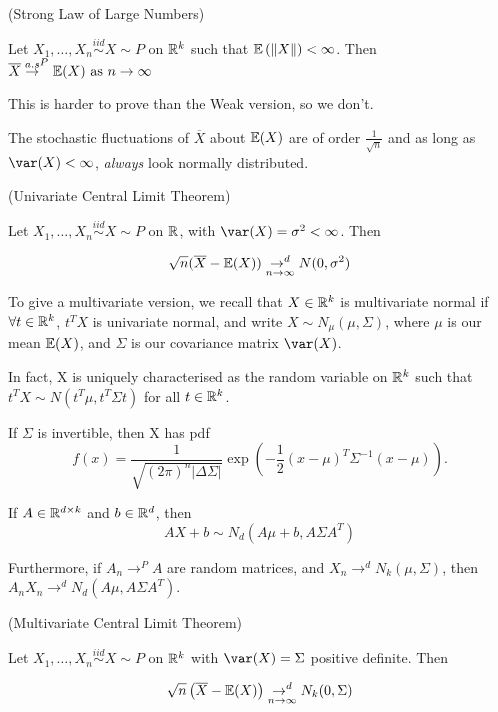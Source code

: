 \documentclass[a4paper]{article}
\begin{document}
\begin{thm}
	(Strong Law of Large Numbers)

	Let $X_1, \ldots, X_n \stackrel{iid}{\sim} X \sim P$ on $\mathbb{R}^{k}$ such that $\mathbb{E}\left(\|X\|  \right)  < \infty$. Then $\overline{X} \overset{a.s}{\to}^{P} \mathbb{E}(X) \text{ as } n \to \infty$
\end{thm}

This is harder to prove than the Weak version, so we don't.

The stochastic fluctuations of $\overline{X}$ about $\mathbb{E}(X)$ are of order $\frac{1}{\sqrt{n} }$ and as long as $\var(X) < \infty$, \textit{always} look normally distributed.

\begin{thm}
	(Univariate Central Limit Theorem)

	Let $X_1, \ldots, X_n \stackrel{iid}{\sim} X \sim P$ on $\mathbb{R}$, with $\var(X) = \sigma^2 < \infty$. Then

	\[
		\sqrt{n} (\overline{X} - \mathbb{E}(X)) \underset{n \to  \infty}{\to^{d}} N(0, \sigma^2)
	\] 
\end{thm}

To give a multivariate version, we recall that $X \in \mathbb{R}^{k}$ is multivariate normal if $\forall t \in \mathbb{R}^{k}$, $t^{T}X$ is univariate normal, and write $X\sim N_{\mu}(\mu, \Sigma)$, where $\mu$ is our mean  $\mathbb{E}(X)$, and  $\Sigma $ is our covariance matrix $\var(X)$.

In fact, X is uniquely characterised as the random variable on  $\mathbb{R}^{k}$ such that $t ^{T}X \sim N(t ^{T}\mu, t ^{T}\Sigma t)$ for all $t \in \mathbb{R}^{k}$.

If $\Sigma$ is invertible, then X has pdf
\[
	f(x) = \frac{1}{\sqrt{(2\pi)^{n}|\Delta \Sigma|} } \exp\left( - \frac{1}{2} (x-\mu)^{T} \Sigma^{-1} (x - \mu) \right) 
.\] 

If $A \in \mathbb{R}^{d\times k}$ and $b \in \mathbb{R}^{d}$, then
\[
	AX + b \sim N_{d}\left( A\mu + b, A\Sigma A^{T} \right) 
\] 

Furthermore, if $A_{n} \to^{P} A$ are random matrices, and $X_n \to ^{d} N_{k}\left( \mu, \Sigma \right) $, then $A_n X_n \to ^{d} N_{d}\left( A\mu, A\Sigma A^{T} \right) $.

\begin{thm}
	(Multivariate Central Limit Theorem)

	Let $X_1, \ldots, X_n \stackrel{iid}{\sim} X \sim P$ on $\mathbb{R}^{k}$ with $\var(X) = \Sigma$ positive definite. Then

	 \[
		 \sqrt{n} \left( \overline{X} - \mathbb{E}(X) \right) \underset{n \to \infty}{\to ^{d}} N_{k}(0, \Sigma)
	\] 
\end{thm}
\end{document}
